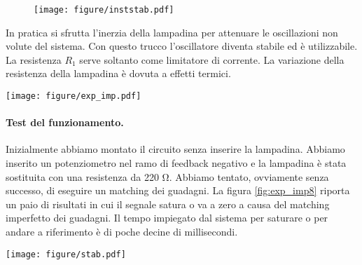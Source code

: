 \begin{figure}[b!]
    \centering
    \texttt{[image: figure/inststab.pdf]}
    \caption{}
    \label{fig:instabilita8}
\end{figure}

In pratica si sfrutta l'inerzia della lampadina per attenuare le oscillazioni non volute del sistema. Con questo trucco
l'oscillatore diventa stabile ed è utilizzabile. La resistenza $R_1$ serve soltanto come limitatore di corrente.
La variazione della resistenza della lampadina è dovuta a effetti termici.

\begin{figure*}[b!]
    \centering
    \texttt{[image: figure/exp\_imp.pdf]}
    \caption{Se la lampadina è assente il sistema è instabile e tende ad andare a zero (grafico a destra) oppure
        ad entrare in saturazione (immagine a sinistra). Nel caso di guadagno maggiore di 1 è evidente che l'operazionale entra in saturazione a circa
        12 V. L'immagine riporta solo la modulante del segnale. Ingrandendo l'immagine è possibile vedere che il segnale modulante
        contiene un onda sinusoidale.}
    \label{fig:exp_imp8}
\end{figure*}

\paragraph{Test del funzionamento.}

Inizialmente abbiamo montato il circuito senza inserire la lampadina. Abbiamo inserito un potenziometro nel ramo di feedback negativo
e la lampadina è stata sostituita con una resistenza da 220 \si{\ohm}. Abbiamo tentato, ovviamente senza successo, di eseguire
un matching dei guadagni. La figura \ref{fig:exp_imp8} riporta un paio di risultati in cui il segnale satura o va a zero a causa
del matching imperfetto dei guadagni. Il tempo impiegato dal sistema per saturare o per andare a riferimento è di poche decine
di millisecondi.

\begin{figure*}
    \centering
    \texttt{[image: figure/stab.pdf]}
    \caption{Nella figura a sinistra è mostrato il segnale modulante all'accensione del circuito. Il sistema oscilla ma a causa dell'inerzia della
        lampadina, dopo circa 2 secondi diventa stabile. L'ampiezza delle oscillazioni si riduce sempre di più. Nel grafico a destra è invece mostrato
        l'output dell'oscillatore una volta che si è stabilizzato. L'output è una sinusoide ed ha una frequenza di 1675 $\pm$ 5 Hz.}
    \label{fig:stab8}
\end{figure*}

